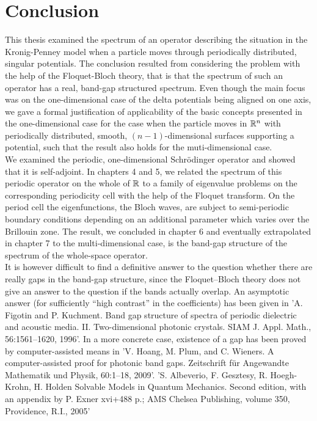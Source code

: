 \chapter{Conclusion} \label{chap:8}
	
This thesis examined the spectrum of an operator describing the situation in the Kronig-Penney model when a particle moves through periodically distributed, singular potentials. The conclusion resulted from considering the problem with the help of the Floquet-Bloch theory, that is that the spectrum of such an operator has a real, band-gap structured spectrum. Even though the main focus was on the one-dimensional case of the delta potentials being aligned on one axis, we gave a formal justification of applicability of the basic concepts presented in the one-dimensional case for the case when the particle moves in $\mathbb{R}^{n}$ with periodically distributed, smooth, $(n-1)$-dimensional surfaces supporting a potential, such that the result also holds for the muti-dimensional case. 
~\\

We examined the periodic, one-dimensional Schrödinger operator and showed that it is self-adjoint. In chapters 4 and 5, we related the spectrum of this periodic operator on the whole of $\mathbb{R}$ to a family of eigenvalue problems on the corresponding periodicity cell with the help of the Floquet transform. On the period cell the eigenfunctions, the Bloch waves, are subject to semi-periodic boundary conditions depending on an additional parameter which varies over the Brillouin zone. The result, we concluded in chapter 6 and eventually extrapolated in chapter 7 to the multi-dimensional case, is the band-gap structure of the spectrum of the whole-space operator.
~\\

It is however difficult to find a definitive answer to the question whether there are really gaps in the band-gap structure, since the Floquet–Bloch theory does not give an answer to the question if the bands actually overlap. 
An asymptotic answer (for sufficiently “high contrast” in the coefficients) has been given in 'A. Figotin and P. Kuchment. Band gap structure of spectra of periodic dielectric and acoustic media. II. Two-dimensional photonic crystals. SIAM J. Appl. Math., 56:1561–1620, 1996'. 
In a more concrete case, existence of a gap has been proved by computer-assisted means in 'V. Hoang, M. Plum, and C. Wieners. A computer-assisted proof for photonic band gaps. Zeitschrift für Angewandte Mathematik und Physik, 60:1–18, 2009'.
'S. Albeverio, F. Gesztesy, R. Hoegh-Krohn, H. Holden Solvable Models in Quantum Mechanics. Second edition, with an appendix by P. Exner xvi+488 p.; AMS Chelsea Publishing, volume 350, Providence, R.I., 2005'
~\\

